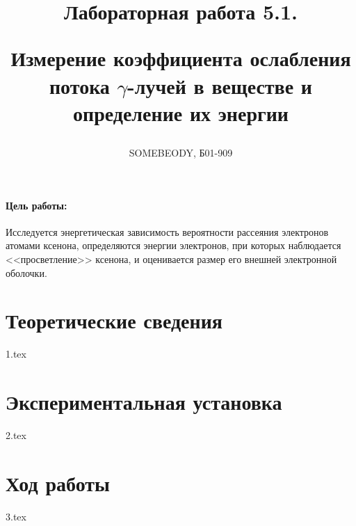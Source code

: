 \documentclass[a5paper, 10pt, twoside]{article} %
\title
{\hfill \break  \hfill \break
\hfill \break  \hfill \break
Лабораторная работа 5.1.

Измерение коэффициента ослабления потока $\gamma$-лучей в веществе и определение
их энергии}
\author{SOMEBEODY, Б01-909}
\begin{document}
\maketitle



\thispagestyle{empty} %

\newpage

\tableofcontents %
\thispagestyle{plain}
\newpage


\paragraph{Цель работы:}

Исследуется энергетическая зависимость вероятности рассеяния электронов атомами
ксенона, определяются энергии электронов, при которых наблюдается
<<просветление>> ксенона, и оценивается размер его внешней электронной оболочки.

\section{Теоретические сведения}
{1.tex}

\section{Экспериментальная установка}
{2.tex}

\section{Ход работы}
{3.tex}
\end{document}
